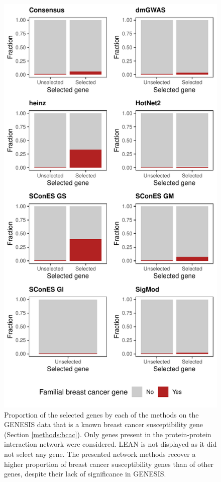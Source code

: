 \documentclass[
  11pt,
]{env/yjiao}
\begin{document}
\begin{figure}

{\centering \includegraphics[height=0.8\textheight]{fig/sfigure_5} 

}

\caption{Proportion of the selected genes by each of the methods on the GENESIS data that is a known breast cancer susceptibility gene (Section \ref{methods:bcac}). Only genes present in the protein-protein interaction network were considered. LEAN is not displayed as it did not select any gene. The presented network methods recover a higher proportion of breast cancer susceptibility genes than of other genes, despite their lack of significance in GENESIS.}\label{fig:disgenet-comparison}
\end{figure}
\end{document}
